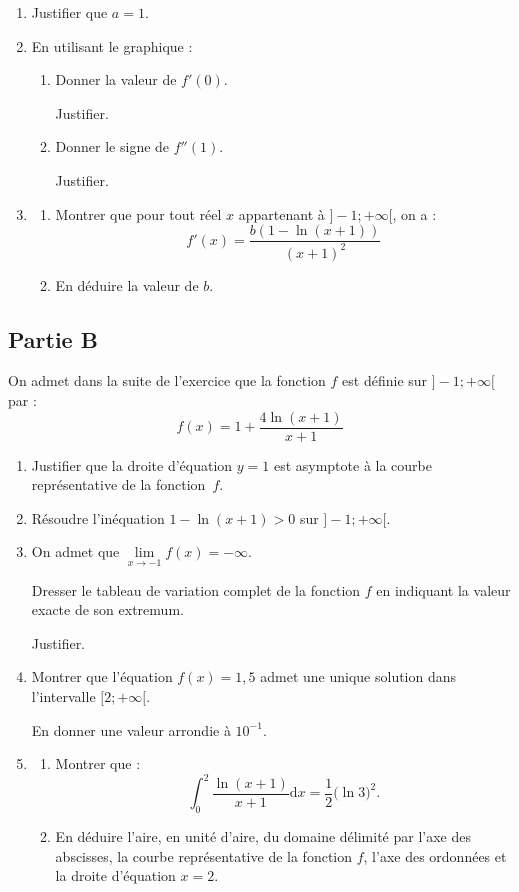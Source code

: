 \documentclass[10pt]{article}
\renewcommand{\d}{{\mathrm{d}}}
\begin{document}
	\begin{enumerate}
		\item Justifier que $a=1$.

		\item En utilisant le graphique :
		\begin{enumerate}
			\item Donner la valeur de $f'(0)$.

			Justifier.
			\item Donner le signe de $f''(1)$.

			Justifier.
		\end{enumerate}

		\item \begin{enumerate}
			\item Montrer que pour tout réel $x$ appartenant à $]-1 ;+\infty[$, on a :
			\[f'(x)=\dfrac{b(1-\ln (x+1))}{(x+1)^{2}}\]

			\item En déduire la valeur de $b$.
		\end{enumerate}
	\end{enumerate}


	\subsection*{Partie B}
	On admet dans la suite de l'exercice que la fonction $f$ est définie sur $]-1 ;+\infty[$ par :
	\[f(x)=1+\dfrac{4 \ln (x+1)}{x+1}\]

	\begin{enumerate}
		\item Justifier que la droite d'équation \quad $y=1$ \quad est asymptote à la courbe représentative de la fonction~$f$.

		\item Résoudre l'inéquation \quad $1-\ln (x+1)>0$ \quad sur $]-1 ;+\infty[$.

		\item On admet que \quad $\lim\limits_{x \to -1} f(x)=-\infty$.

		Dresser le tableau de variation complet de la fonction $f$ en indiquant la valeur exacte de son extremum.

		Justifier.

		\item Montrer que l'équation \quad $f(x)=1,5$ \quad admet une unique solution dans l'intervalle $[2 ; +\infty[$.

		En donner une valeur arrondie à $10^{-1}$.

		\item \begin{enumerate}
			\item Montrer que :
			\[\int_{0}^{2} \dfrac{\ln (x+1)}{x+1} \d x=\dfrac{1}{2}\big(\ln 3\big)^{2}.\]

			\item En déduire l'aire, en unité d'aire, du domaine délimité par l'axe des abscisses, la courbe représentative de la fonction $f$, l'axe des ordonnées et la droite d'équation \quad $x=2$.
		\end{enumerate}
	\end{enumerate}
\end{document}
